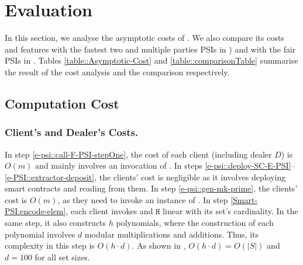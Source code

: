 

\vspace{-4mm}

\section{Evaluation}\label{sec::valuation}

\vspace{-3mm}

In this section, we analyse the asymptotic costs of \epsi. We also compare its costs and features with the fastest two and multiple parties PSIs in \cite{AbadiDMT22,DBLP:conf/ccs/KolesnikovMPRT17,NevoTY21,RaghuramanR22}) and with the fair PSIs in \cite{DebnathD16,DBLP:conf/dbsec/DongCCR13}. Tables \ref{table::Asymptotic-Cost} and \ref{table::comparisonTable} summarise the result of the cost analysis and the comparison respectively. 

\vspace{-4.5mm}


\vspace{-4.5mm}


\vspace{-6mm}
\subsection{Computation Cost}

\vspace{-1mm}
\subsubsection{Client's and Dealer's Costs.}

In step \ref{e-psi::call-F-PSI-stepOne}, the cost of each client (including dealer $D$) is $O(m)$ and mainly involves an invocation of \ct. 
% 
In steps \ref{e-psi::deploy-SC-E-PSI}--\ref{e-PSI::extractor-deposit}, the clients' cost is negligible as it involves deploying smart contracts and reading from them. 
%
In step \ref{e-psi::gen-mk-prime}, the clients' cost is  $O(m)$, as they need to invoke an instance of \ct. 
%
In step \ref{Smart-PSI:encode-elem}, each client invokes \prp and $\mathtt{H}$ linear with its set's cardinality. In the same step, it also constructs $h$ polynomials, where the construction of each polynomial involves $d$  modular multiplications and additions. Thus, its complexity in this step is $O(h\cdot d)$. As shown in \cite{AbadiDMT22},  $O(h\cdot d)=O(|S|)$ and  $d=100$ for all set sizes. 
%


